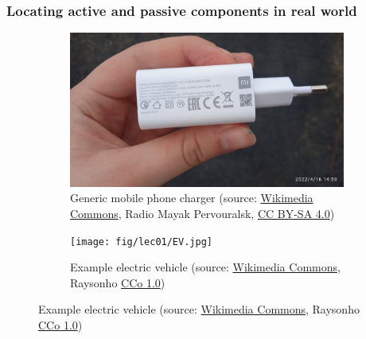\begin{frame}
	\frametitle{Locating active and passive components in real world}
	\begin{figure}
		\centering
		\begin{subfigure}[t]{0.4\textwidth}
			\centering
			\includegraphics[scale=0.035]{fig/lec01/charger_3.jpg}
			\caption{Generic mobile phone charger (source: \href{https://commons.wikimedia.org/wiki/File:Charger_Xioami.jpg}{Wikimedia Commons}, Radio Mayak Pervouralsk, \href{https://creativecommons.org/licenses/by-sa/4.0/}{CC BY-SA 4.0})}
		\end{subfigure}
		\begin{subfigure}[t]{0.4\textwidth}
			\centering
			\texttt{[image: fig/lec01/EV.jpg]}
			\caption{Example electric vehicle (source: \href{https://commons.wikimedia.org/wiki/File:IBMTorontoSoftwareLabEVChargers4.jpg}{Wikimedia Commons}, Raysonho \href{https://creativecommons.org/publicdomain/zero/1.0/deed.en}{CCo 1.0})}
		\end{subfigure}
	\end{figure}
\end{frame}

